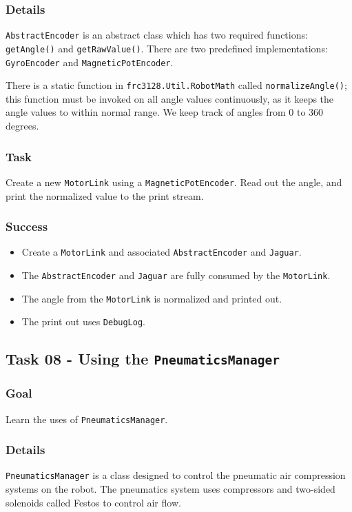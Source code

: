 \documentclass[a4paper]{article}
\begin{document}
\subsubsection{Details} \lstinline{AbstractEncoder} is an abstract class which has two required functions: \lstinline{getAngle()} and \lstinline{getRawValue()}. There are two predefined implementations: \lstinline{GyroEncoder} and \lstinline{MagneticPotEncoder}. 

There is a static function in \lstinline{frc3128.Util.RobotMath} called \lstinline{normalizeAngle()}; this function must be invoked on all angle values continuously, as it keeps the angle values to within normal range. We keep track of angles from 0 to 360 degrees. 
\subsubsection{Task} Create a new \lstinline{MotorLink} using a \lstinline{MagneticPotEncoder}. Read out the angle, and print the normalized value to the print stream.
\subsubsection{Success}\begin{itemize}\item{Create a \lstinline{MotorLink} and associated \lstinline{AbstractEncoder} and \lstinline{Jaguar}.}\item{The \lstinline{AbstractEncoder} and \lstinline{Jaguar} are fully consumed by the \lstinline{MotorLink}.}\item{The angle from the \lstinline{MotorLink} is normalized and printed out.}\item{The print out uses \lstinline{DebugLog}.}\end{itemize}

\subsection{Task 08 - Using the \lstinline{PneumaticsManager}}
\subsubsection{Goal} Learn the uses of \lstinline{PneumaticsManager}.
\subsubsection{Details} \lstinline{PneumaticsManager} is a class designed to control the pneumatic air compression systems on the robot. The pneumatics system uses compressors and two-sided solenoids called Festos to control air flow.
\end{document}
